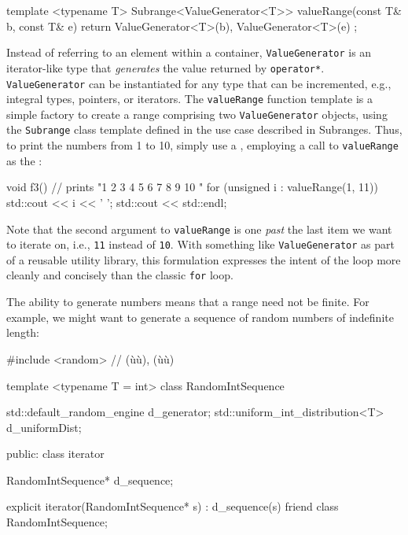 {{\begin{emcppslisting}[emcppsbatch=e2]
template <typename T>
Subrange<ValueGenerator<T>> valueRange(const T& b, const T& e)
{
    return { ValueGenerator<T>(b), ValueGenerator<T>(e) };
}
\end{emcppslisting}


\noindent Instead of referring to an element within a container,
\lstinline!ValueGenerator! is an iterator-like type that \emph{generates}
the value returned by \lstinline!operator*!. \lstinline!ValueGenerator! can be
instantiated for any type that can be incremented, e.g., integral types,
pointers, or iterators. The \lstinline!valueRange! function template is a
simple factory to create a range comprising two \lstinline!ValueGenerator!
objects, using the \lstinline!Subrange! class template defined in the use
case described in {Subranges}. Thus, to print the numbers from 1 to 10,
simply use a , employing a call to
\lstinline!valueRange! as the :

\begin{emcppslisting}[emcppsbatch=e2]
void f3()
{
    // prints "1 2 3 4 5 6 7 8 9 10 "
    for (unsigned i : valueRange(1, 11))
    {
        std::cout << i << ' ';
    }
    std::cout << std::endl;
}
\end{emcppslisting}


\noindent Note that the second argument to \lstinline!valueRange! is one \emph{past}
the last item we want to iterate on, i.e., \lstinline!11! instead of
\lstinline!10!. With something like \lstinline!ValueGenerator! as part of a
reusable utility library, this formulation expresses the intent of the
loop more cleanly and concisely than the classic \lstinline!for! loop.

The ability to generate numbers means that a range need not be finite.
For example, we might want to generate a sequence of random numbers of
indefinite length:

\begin{emcppslisting}[emcppsbatch=e2]
#include <random>  // (ù{}ù), (ù{}ù)

template <typename T = int>
class RandomIntSequence
{
    std::default_random_engine       d_generator;
    std::uniform_int_distribution<T> d_uniformDist;

public:
    class iterator
    {
        RandomIntSequence* d_sequence;

        explicit iterator(RandomIntSequence* s) : d_sequence(s) { }
        friend class RandomIntSequence;

}}
\end{emcppslisting}}}
